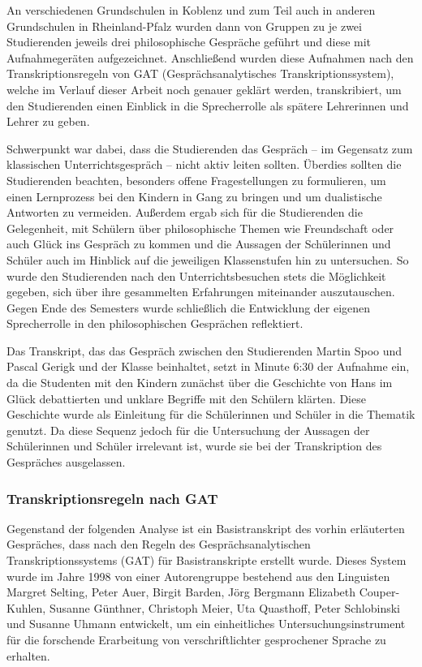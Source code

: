 An verschiedenen Grundschulen in Koblenz und zum Teil auch in anderen Grundschulen in Rheinland-Pfalz wurden dann von Gruppen zu je zwei Studierenden jeweils drei philosophische Gespräche geführt und diese mit Aufnahmegeräten aufgezeichnet. 
Anschließend wurden diese Aufnahmen nach den Transkriptionsregeln von GAT (Gesprächsanalytisches Transkriptionssystem), welche im Verlauf dieser Arbeit noch genauer geklärt werden, transkribiert, um den Studierenden einen Einblick in die Sprecherrolle als spätere Lehrerinnen und Lehrer zu geben. 

Schwerpunkt war dabei, dass die Studierenden das Gespräch -- im Gegensatz zum klassischen Unterrichtsgespräch -- nicht aktiv leiten sollten. 
Überdies sollten die Studierenden beachten, besonders offene Fragestellungen zu formulieren, um einen Lernprozess bei den Kindern in Gang zu bringen und um dualistische Antworten zu vermeiden. 
Außerdem ergab sich für die Studierenden die Gelegenheit, mit Schülern über philosophische Themen wie Freundschaft oder auch Glück ins Gespräch zu kommen und die Aussagen der Schülerinnen und Schüler auch im Hinblick auf die jeweiligen Klassenstufen hin zu untersuchen. 
So wurde den Studierenden nach den Unterrichtsbesuchen stets die Möglichkeit gegeben, sich über ihre gesammelten Erfahrungen miteinander auszutauschen.
Gegen Ende des Semesters wurde schließlich die Entwicklung der eigenen Sprecherrolle in den philosophischen Gesprächen reflektiert.

Das Transkript, das das Gespräch zwischen den Studierenden Martin Spoo und Pascal Gerigk und der Klasse beinhaltet, setzt in Minute 6:30 der Aufnahme ein, da die Studenten mit den Kindern zunächst über die Geschichte von Hans im Glück debattierten und unklare Begriffe mit den Schülern klärten. 
Diese Geschichte wurde als Einleitung für die Schülerinnen und Schüler in die Thematik genutzt.
Da diese Sequenz jedoch für die Untersuchung der Aussagen der Schülerinnen und Schüler irrelevant ist, wurde sie bei der Transkription des Gespräches ausgelassen.


\subsubsection{Transkriptionsregeln nach GAT}

Gegenstand der folgenden Analyse ist ein Basistranskript des vorhin erläuterten Gespräches, dass nach den Regeln des Gesprächsanalytischen Transkriptionssystems (GAT) für Basistranskripte erstellt wurde. 
Dieses System wurde im Jahre 1998 von einer Autorengruppe bestehend aus den Linguisten Margret Selting, Peter Auer, Birgit Barden, Jörg Bergmann Elizabeth Couper-Kuhlen, Susanne Günthner, Christoph Meier, Uta Quasthoff, Peter Schlobinski und Susanne Uhmann entwickelt, um ein einheitliches Untersuchungsinstrument für die forschende Erarbeitung von verschriftlichter gesprochener Sprache zu erhalten. 

